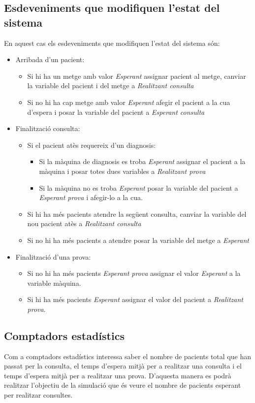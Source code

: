 \documentclass[a4paper]{article}
\begin{document}
\subsection{Esdeveniments que modifiquen l'estat del sistema}
En aquest cas els esdeveniments que modifiquen l'estat del sistema són:
\begin{itemize}
	\item Arribada d'un pacient: 
	\begin{itemize}
		\item Si hi ha un metge amb valor \emph{Esperant} assignar pacient al metge, canviar la variable del pacient i del metge a \emph{Realitzant consulta}
		\item Si no hi ha cap metge amb valor \emph{Esperant} afegir el pacient a la cua d'espera i posar la variable del pacient a \emph{Esperant consulta}
	\end{itemize}
	\item Finalització consulta:
	\begin{itemize}
		\item Si el pacient atès requereix d'un diagnosis:
		\begin{itemize}
			 \item Si la màquina de diagnosis es troba \emph{Esperant} assignar el pacient a la màquina i posar totes dues variables a \emph{Realitzant prova}
			 \item Si la màquina no es troba \emph{Esperant} posar la variable del pacient a \emph{Esperant prova} i afegir-lo a la cua.
		\end{itemize}
		\item Si hi ha més pacients atendre la següent consulta, canviar la variable del nou pacient atès a \emph{Realitzant consulta}
		\item Si no hi ha més pacients a atendre posar la variable del metge a \emph{Esperant}
	\end{itemize}
	\item Finalització d'una prova:
	\begin{itemize}
		\item Si no hi ha més pacients \emph{Esperant prova} assignar el valor \emph{Esperant} a la variable màquina.
		\item Si hi ha més pacients \emph{Esperant} assignar el valor del pacient a \emph{Realitzant prova}.
	\end{itemize}
\end{itemize}

\subsection{Comptadors estadístics}
Com a comptadors estadístics interessa saber el nombre de pacients total que han passat per la consulta, el temps d'espera mitjà per a realitzar una consulta i el temps d'espera mitjà per a realitzar una prova. D'aquesta manera es podrà realitzar l'objectiu de la simulació que és veure el nombre de pacients esperant per realitzar consultes.
\end{document}
